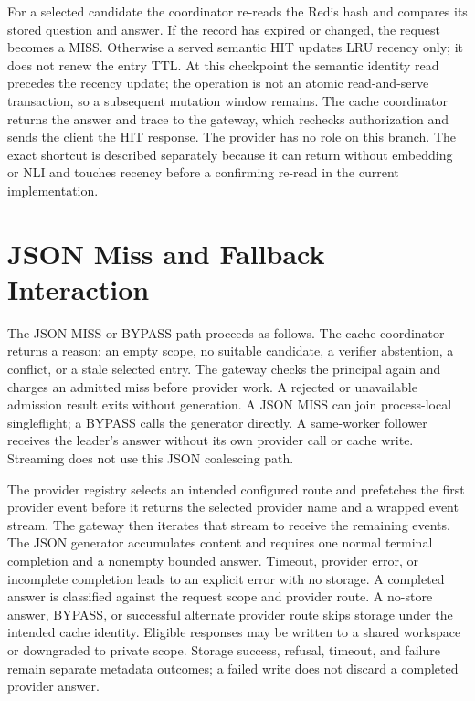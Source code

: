 For a selected candidate the coordinator re-reads the Redis hash and compares its stored question and answer. If the record has expired or changed, the request becomes a MISS. Otherwise a served semantic HIT updates LRU recency only; it does not renew the entry TTL. At this checkpoint the semantic identity read precedes the recency update; the operation is not an atomic read-and-serve transaction, so a subsequent mutation window remains. The cache coordinator returns the answer and trace to the gateway, which rechecks authorization and sends the client the HIT response. The provider has no role on this branch. The exact shortcut is described separately because it can return without embedding or NLI and touches recency before a confirming re-read in the current implementation.

\section{JSON Miss and Fallback Interaction}
The JSON MISS or BYPASS path proceeds as follows. The cache coordinator returns a reason: an empty scope, no suitable candidate, a verifier abstention, a conflict, or a stale selected entry. The gateway checks the principal again and charges an admitted miss before provider work. A rejected or unavailable admission result exits without generation. A JSON MISS can join process-local singleflight; a BYPASS calls the generator directly. A same-worker follower receives the leader's answer without its own provider call or cache write. Streaming does not use this JSON coalescing path.

The provider registry selects an intended configured route and prefetches the first provider event before it returns the selected provider name and a wrapped event stream. The gateway then iterates that stream to receive the remaining events. The JSON generator accumulates content and requires one normal terminal completion and a nonempty bounded answer. Timeout, provider error, or incomplete completion leads to an explicit error with no storage. A completed answer is classified against the request scope and provider route. A no-store answer, BYPASS, or successful alternate provider route skips storage under the intended cache identity. Eligible responses may be written to a shared workspace or downgraded to private scope. Storage success, refusal, timeout, and failure remain separate metadata outcomes; a failed write does not discard a completed provider answer.

